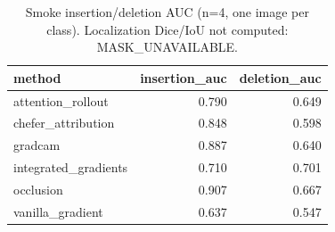 \begin{table}
\caption{Smoke insertion/deletion AUC (n=4, one image per class). Localization Dice/IoU not computed: MASK_UNAVAILABLE.}
\label{tab:xai-smoke}
\begin{tabular}{lrr}
\toprule
method & insertion_auc & deletion_auc \\
\midrule
attention_rollout & 0.790 & 0.649 \\
chefer_attribution & 0.848 & 0.598 \\
gradcam & 0.887 & 0.640 \\
integrated_gradients & 0.710 & 0.701 \\
occlusion & 0.907 & 0.667 \\
vanilla_gradient & 0.637 & 0.547 \\
\bottomrule
\end{tabular}
\end{table}
